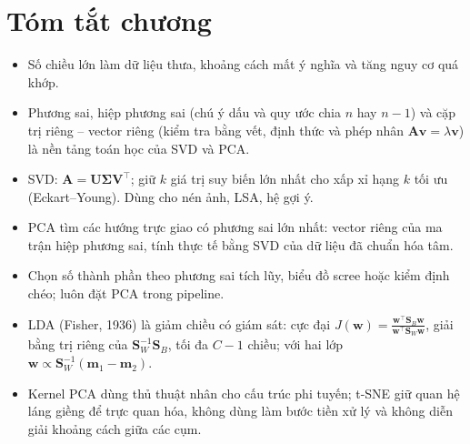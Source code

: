 \section{Tóm tắt chương}
\begin{itemize}
    \item Số chiều lớn làm dữ liệu thưa, khoảng cách mất ý nghĩa và tăng nguy cơ quá khớp.
    \item Phương sai, hiệp phương sai (chú ý dấu và quy ước chia $n$ hay $n - 1$) và cặp trị riêng -- vector riêng (kiểm tra bằng vết, định thức và phép nhân $\mathbf{A}\mathbf{v} = \lambda\mathbf{v}$) là nền tảng toán học của SVD và PCA.
    \item SVD: $\mathbf{A} = \mathbf{U}\boldsymbol{\Sigma}\mathbf{V}^{\top}$; giữ $k$ giá trị suy biến lớn nhất cho xấp xỉ hạng $k$ tối ưu (Eckart--Young). Dùng cho nén ảnh, LSA, hệ gợi ý.
    \item PCA tìm các hướng trực giao có phương sai lớn nhất: vector riêng của ma trận hiệp phương sai, tính thực tế bằng SVD của dữ liệu đã chuẩn hóa tâm.
    \item Chọn số thành phần theo phương sai tích lũy, biểu đồ scree hoặc kiểm định chéo; luôn đặt PCA trong pipeline.
    \item LDA (Fisher, 1936) là giảm chiều có giám sát: cực đại $J(\mathbf{w}) = \frac{\mathbf{w}^\top\mathbf{S}_B\mathbf{w}}{\mathbf{w}^\top\mathbf{S}_W\mathbf{w}}$, giải bằng trị riêng của $\mathbf{S}_W^{-1}\mathbf{S}_B$, tối đa $C - 1$ chiều; với hai lớp $\mathbf{w} \propto \mathbf{S}_W^{-1}(\mathbf{m}_1 - \mathbf{m}_2)$.
    \item Kernel PCA dùng thủ thuật nhân cho cấu trúc phi tuyến; t-SNE giữ quan hệ láng giềng để trực quan hóa, không dùng làm bước tiền xử lý và không diễn giải khoảng cách giữa các cụm.
\end{itemize}

